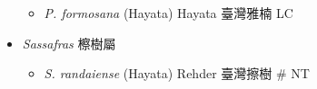 \begin{itemize}
  \begin{itemize}
        \item[] \textit{P. formosana} (Hayata) Hayata  臺灣雅楠   LC
  \end{itemize}
 \item[] \textit{Sassafras} 檫樹屬
                                
  \begin{itemize}
        \item[] \textit{S. randaiense} (Hayata) Rehder  臺灣擦樹  \# NT
  \end{itemize}
  \end{itemize}
